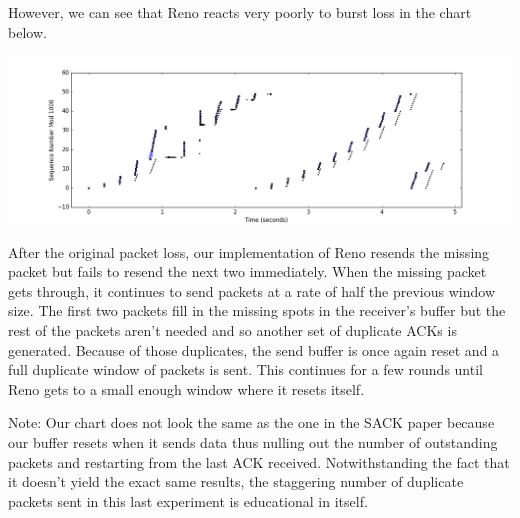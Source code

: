 \documentclass[11pt]{article}
\begin{document}
\vspace{5mm}

However, we can see that Reno reacts very poorly to burst loss in the chart below.

\vspace{5mm}

\includegraphics[width=17cm]{charts/renoburst.png}

\vspace{5mm}

After the original packet loss, our implementation of Reno resends the missing packet but fails to resend the next two immediately. When the missing packet gets through, it continues to send packets at a rate of half the previous window size. The first two packets fill in the missing spots in the receiver's buffer but the rest of the packets aren't needed and so another set of duplicate ACKs is generated. Because of those duplicates, the send buffer is once again reset and a full duplicate window of packets is sent. This continues for a few rounds until Reno gets to a small enough window where it resets itself.

\vspace{5mm}

Note: Our chart does not look the same as the one in the SACK paper because our buffer resets when it sends data thus nulling out the number of outstanding packets and restarting from the last ACK received. Notwithstanding the fact that it doesn't yield the exact same results, the staggering number of duplicate packets sent in this last experiment is educational in itself.

\vspace{5mm}

\vspace{5mm}
\end{document}

